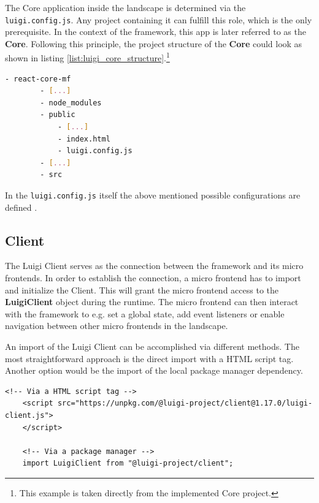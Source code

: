 The Core application inside the landscape is determined via the \texttt{luigi.config.js}. Any project containing it can fulfill this role, which is the only prerequisite. In the context of the framework, this app is later referred to as the \textbf{Core}.
Following this principle, the project structure of the \textbf{Core} could look as shown in listing \ref{list:luigi_core_structure}.\footnote{This example is taken directly from the implemented Core project.}

\begin{lstlisting}[language=Bash, caption=Project structure for a Luigi Core application including the \texttt{luigi.config.js} , label=list:luigi_core_structure,  xleftmargin=.0\textwidth, xrightmargin=.0\textwidth]
	- react-core-mf
		- [...]
		- node_modules
		- public
			- [...]
			- index.html
			- luigi.config.js
		- [...]
		- src
\end{lstlisting}

In the \texttt{luigi.config.js} itself the above mentioned possible configurations are defined \newline \cite{luigi_doc_core}.

\subsection{Client}

The Luigi Client serves as the connection between the framework and its micro frontends. In order to establish the connection, a micro frontend has to import and initialize the Client. This will grant the micro frontend access to the \textbf{LuigiClient} object during the runtime. The micro frontend can then interact with the framework to e.g. set a global state, add event listeners or enable navigation between other micro frontends in the landscape.

An import of the Luigi Client can be accomplished via different methods. The most straightforward approach is the direct import with a HTML script tag. Another option would be the import of the local package manager dependency.\cite{luigi_client}

\begin{lstlisting}[caption=Import methods of the Luigi Client, label=list:import_luigi_client,  xleftmargin=.0\textwidth, xrightmargin=.0\textwidth]
	<!-- Via a HTML script tag -->
	<script src="https://unpkg.com/@luigi-project/client@1.17.0/luigi-client.js">
	</script>
	
	<!-- Via a package manager -->
	import LuigiClient from "@luigi-project/client";
\end{lstlisting}

